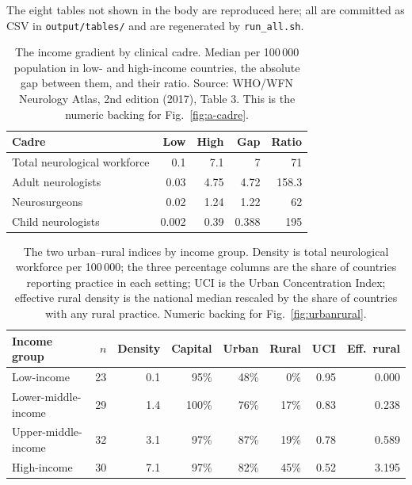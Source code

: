 \documentclass[9pt,twoside]{pnas-new}
\begin{document}
The eight tables not shown in the body are reproduced here; all are committed as CSV in \texttt{output/tables/} and are regenerated by \texttt{run\_all.sh}.

\begin{table}[!ht]
\centering
\caption{The income gradient by clinical cadre. Median per 100\,000 population in low- and high-income countries, the absolute gap between them, and their ratio. Source: WHO/WFN Neurology Atlas, 2nd edition (2017), Table 3. This is the numeric backing for Fig.~\ref{fig:a-cadre}.}
\label{tab:a-cadre}
\small
\begin{tabular}{lrrrr}
\toprule
Cadre & Low & High & Gap & Ratio \\
\midrule
Total neurological workforce & 0.1 & 7.1 & 7 & 71 \\
Adult neurologists & 0.03 & 4.75 & 4.72 & 158.3 \\
Neurosurgeons & 0.02 & 1.24 & 1.22 & 62 \\
Child neurologists & 0.002 & 0.39 & 0.388 & 195 \\
\bottomrule
\end{tabular}
\end{table}

\begin{table}[!ht]
\centering
\caption{The two urban--rural indices by income group. Density is total neurological workforce per 100\,000; the three percentage columns are the share of countries reporting practice in each setting; UCI is the Urban Concentration Index; effective rural density is the national median rescaled by the share of countries with any rural practice. Numeric backing for Fig.~\ref{fig:urbanrural}.}
\label{tab:a-urbanrural}
\footnotesize
\begin{tabular}{lrrrrrrr}
\toprule
Income group & $n$ & Density & Capital & Urban & Rural & UCI & Eff.\ rural \\
\midrule
Low-income & 23 & 0.1 & 95\% & 48\% & 0\% & 0.95 & 0.000 \\
Lower-middle-income & 29 & 1.4 & 100\% & 76\% & 17\% & 0.83 & 0.238 \\
Upper-middle-income & 32 & 3.1 & 97\% & 87\% & 19\% & 0.78 & 0.589 \\
High-income & 30 & 7.1 & 97\% & 82\% & 45\% & 0.52 & 3.195 \\
\bottomrule
\end{tabular}
\end{table}
\end{document}
